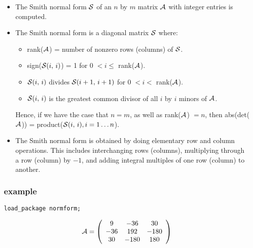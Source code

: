\begin{itemize}
\item The Smith normal form ${\cal S}$ of an $n$ by $m$ matrix 
${\cal A}$ with integer entries is computed.

\item The Smith normal form is a diagonal matrix ${\cal S}$ where:

  \begin{itemize}
  \item rank(${\cal A}$) = number of nonzero rows (columns) of 
        ${\cal S}$.
  \item sign(${\cal S}(i,\, i)$) = 1 for 0 $< i \leq $ rank(${\cal A}$).
  \item ${\cal S}(i,\, i)$ divides ${\cal S}(i+1,\, i+1)$ for 0 $< i
        <$ rank(${\cal A}$).
  \item ${\cal S}(i,\,i)$ is the greatest common divisor of all $i$ by 
        $i$ minors of ${\cal A}$.
  \end{itemize}

      Hence, if we have the case that $n = m$, as well as 
      rank(${\cal A}$) $= n$, then abs(det(${\cal A}$)) = 
      product(${\cal S}(i,\,i),i=1\ldots n$).
      
\item The Smith normal form is obtained by doing elementary row and 
      column operations. This includes interchanging rows (columns),
      multiplying through a row (column) by $-1$, and adding integral 
      multiples of one row (column) to another. 
\end{itemize}

\subsubsection{example}

{\tt load\_package normform;}

\begin{displaymath}
{\cal A} = \left( \begin{array}{ccc} 9 & -36 & 30 \\ -36 & 192 & -180 \\
30 & -180 & 180  \end{array} 
\right)
\end{displaymath}


